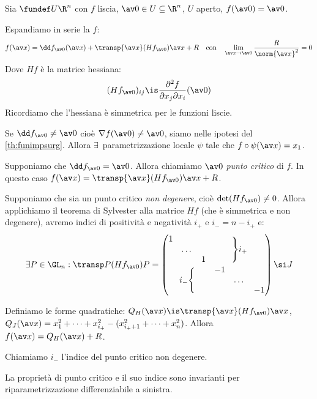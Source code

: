 Sia $\fundef U{\R^n}$ con $f$ liscia, $\av 0\in U\subseteq\R^n$, $U$ aperto, $f(\av0)=\av0$.

Espandiamo in serie la $f$:
\[f(\av x)=
\dd f_{\av0}(\av x)+\transp{\av x}(Hf_{\av0})\av x+R
\quad\text{con}\quad
\lim_{\av x\to\av0}\frac R{\norm{\av x}^2}=0\]
Dove $Hf$ è la matrice hessiana:
\[(Hf_{\av0})_{ij}\is
\frac{\partial^2f}{\partial x_j\partial x_i}(\av0)\]
Ricordiamo che l'hessiana è simmetrica per le funzioni liscie.

Se $\dd f_{\av0}\neq\av0$ cioè $\nabla f(\av0)\neq\av0$, siamo nelle ipotesi del \autoref{th:funimpsurg}. Allora $\exists$~parametrizzazione locale $\psi$ tale che $f\circ\psi(\av x)=x_1$.

Supponiamo che $\dd f_{\av0}=\av0$. Allora chiamiamo $\av0$ \emph{punto critico} di $f$. In questo caso $f(\av x)=\transp{\av x}(Hf_{\av0})\av x+R$.

Supponiamo che sia un punto critico \emph{non degenere}, cioè $\det(Hf_{\av0})\neq0$. Allora applichiamo il teorema di Sylvester alla matrice $Hf$ (che è simmetrica e non degenere), avremo indici di positività e negatività $i_+$ e $i_-=n-i_+$ e:
\[\exists P\in\GL_n:
\transp P(Hf_{\av0})P=
\begin{pmatrix}
	\begin{matrix}
		1 & & \\
		& \dots & \\
		& & 1 \\
	\end{matrix} & \Bigg\}i_+ \\
	i_-\Bigg\{ & \begin{matrix}
		-1 & & \\
		& \dots & \\
		& & -1 \\
	\end{matrix}
\end{pmatrix}\si J\]

Definiamo le forme quadratiche: $Q_H(\av x)\is\transp{\av x}(Hf_{\av0})\av x$, $Q_J(\av x)=x_1^2+\dots+x_{i_+}^2-(x_{i_++1}^2+\dots+x_n^2)$. Allora $f(\av x)=Q_H(\av x)+R$.

Chiamiamo $i_-$ l'indice del punto critico non degenere.

\begin{ex}
	La proprietà di punto critico e il suo indice sono invarianti per riparametrizzazione differenziabile a sinistra.
\end{ex}

